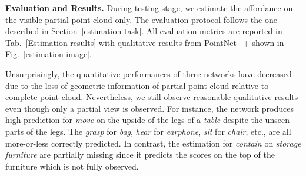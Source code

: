 \documentclass[final]{cvpr}
\begin{document}
\noindent\textbf{Evaluation and Results.} During testing stage, we estimate the affordance on the visible partial point cloud only. The evaluation protocol follows the one described in Section~\ref{estimation task}. All evaluation metrics are reported in Tab.~\ref{Estimation results} with qualitative results from PointNet++ shown in Fig.~\ref{estimation image}. 



Unsurprisingly, the quantitative performances of three networks have decreased due to the loss of geometric information of partial point cloud relative to complete point cloud. Nevertheless, we still observe reasonable qualitative results even though only a partial view is observed. For instance, the network produces high prediction for \textit{move} on the upside of the legs of a \textit{table} despite the unseen parts of the legs. The \textit{grasp} for \textit{bag}, \textit{hear} for \textit{earphone}, \textit{sit} for \textit{chair}, etc., are all more-or-less correctly predicted. In contrast, the estimation for \textit{contain} on \textit{storage furniture} are partially missing since it predicts the scores on the top of the furniture which is not fully observed. 
\end{document}
